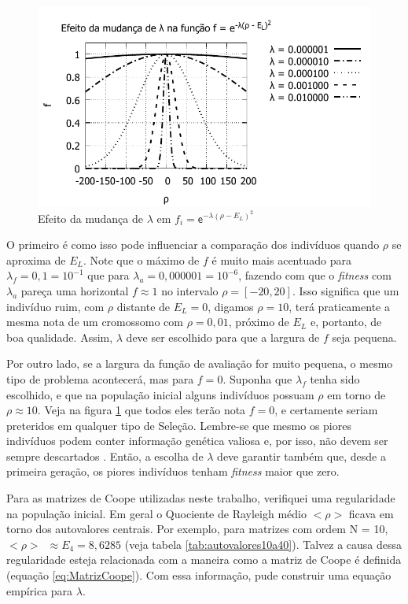 	\begin{figure}[h]
		\centering
			\includegraphics[width=1.0\textwidth]{figs/resultados/precisaoFitness/f_varios_lambdas.pdf}
		\caption{Efeito da mudança de $\lambda$ em $f_i = \mathsf{e}^{-\lambda(\rho - E_L)^2}$}
		\label{fig:f_efeito_lambda}
	\end{figure}
	
	 O primeiro é como isso pode influenciar a comparação dos indivíduos quando $\rho$ se aproxima de $E_L$. Note que o máximo de $f$ é muito mais acentuado para $\lambda_f = 0,1 = 10^{-1}$ que para $\lambda_a = 0,000001 = 10^{-6}$, fazendo com que o \emph{fitness} com $\lambda_a$ pareça uma horizontal $f \approx 1$ no intervalo $\rho = [-20,20]$. Isso significa que um indivíduo ruim, com $\rho$ distante de $E_L = 0$, digamos $\rho = 10$, terá praticamente a mesma nota de um cromossomo com $\rho = 0,01$, próximo de $E_L$ e, portanto, de boa qualidade. Assim, $\lambda$ deve ser escolhido para que a largura de $f$ seja pequena.
	
	Por outro lado, se a largura da função de avaliação for muito pequena, o mesmo tipo de problema acontecerá, mas para $f = 0$. Suponha que $\lambda_f$ tenha sido escolhido, e que na população inicial alguns indivíduos possuam $\rho$ em torno de $\rho \approx 10$. Veja na figura \ref{fig:f_efeito_lambda} que todos eles terão nota $f = 0$, e certamente seriam preteridos em qualquer tipo de Seleção. Lembre-se que mesmo os piores indivíduos podem conter informação genética valiosa e, por isso, não devem ser sempre descartados \cite{Mitchell98}. Então, a escolha de $\lambda$ deve garantir também que, desde a primeira geração, os piores indivíduos tenham \emph{fitness} maior que zero.

	Para as matrizes de Coope utilizadas neste trabalho, verifiquei uma regularidade na população inicial. Em geral o Quociente de Rayleigh médio $<\rho>$ ficava em torno dos autovalores centrais. Por exemplo, para matrizes com ordem N = 10, \mbox{$<\rho>$ $\approx E_4 = 8,6285$} (veja tabela \ref{tab:autovalores10a40}). Talvez a causa dessa regularidade esteja relacionada com a maneira como a matriz de Coope é definida (equação \ref{eq:MatrizCoope}). Com essa informação, pude construir uma equação empírica para $\lambda$.

